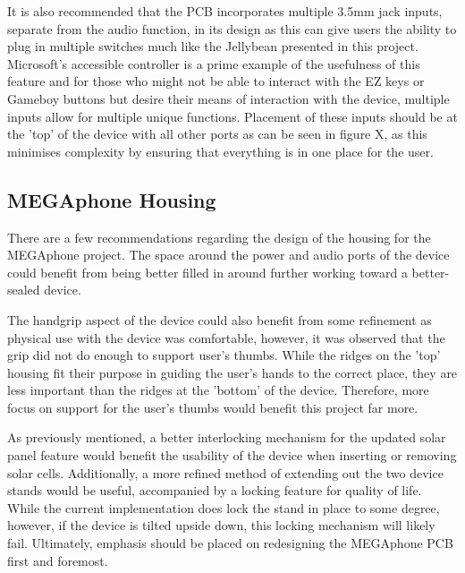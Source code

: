 It is also recommended that the PCB incorporates multiple 3.5mm jack inputs, separate from the audio function, in its design as this can give users the ability to plug in multiple switches much like the Jellybean presented in this project.
Microsoft's accessible controller \cite{adaptive} is a prime example of the usefulness of this feature and for those who might not be able to interact with the EZ keys or Gameboy buttons but desire their means of interaction with the device, multiple inputs allow for multiple unique functions.
Placement of these inputs should be at the 'top' of the device with all other ports as can be seen in figure X, as this minimises complexity by ensuring that everything is in one place for the user.

\subsection{MEGAphone Housing}

There are a few recommendations regarding the design of the housing for the MEGAphone project.
The space around the power and audio ports of the device could benefit from being better filled in around further working toward a better-sealed device.

The handgrip aspect of the device could also benefit from some refinement as physical use with the device was comfortable, however, it was observed that the grip did not do enough to support user's thumbs.
While the ridges on the 'top' housing fit their purpose in guiding the user's hands to the correct place, they are less important than the ridges at the 'bottom' of the device.
Therefore, more focus on support for the user's thumbs would benefit this project far more.

As previously mentioned, a better interlocking mechanism for the updated solar panel feature would benefit the usability of the device when inserting or removing solar cells.
Additionally, a more refined method of extending out the two device stands would be useful, accompanied by a locking feature for quality of life.
While the current implementation does lock the stand in place to some degree, however, if the device is tilted upside down, this locking mechanism will likely fail.
Ultimately, emphasis should be placed on redesigning the MEGAphone PCB first and foremost.



